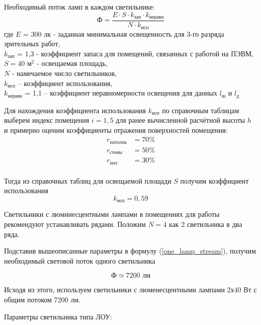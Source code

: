 Необходимый поток ламп в каждом светильнике:
\begin{equation}
\label{one_lamp_stream}
    \text{Ф} = \frac{E \cdot S \cdot k_\text{зап} \cdot k_\text{неравн}}{N \cdot k_\text{исп}}
\end{equation}
где $E$ = 300 лк - заданная минимальная освещенность для 3-го разряда зрительных работ, \\
$k_\text{зап}$ = 1,3 - коэффициент запаса для помещений, связанных с работой на ПЭВМ,   \\
$S = 40 \text{ м}^2$ - освещаемая площадь,                                              \\
$N$ - намечаемое число светильников,                                                    \\
$k_\text{исп}$ – коэффициент использования,                                             \\
$k_\text{неравн}$ = 1,1 – коэффициент неравномерности освещения для данных $l_\text{ш}$ и
$l_\text{д}$

Для нахождения коэффициента использования $k_\text{исп}$ по справочным таблицам
выберем индекс помещения $i = 1,5$ для ранее вычисленной расчётной высоты $h$ и
примерно оценим коэффициенты отражения поверхностей помещения:
\begin{equation}
    \begin{array}{ll}
        r_\text{потолок}    & = 70\% \\
        r_\text{стены}      & = 50\% \\
        r_\text{пол}        & = 30\% \\
    \end{array}
    \label{reflection_coeff}
\end{equation}

Тогда из справочных таблиц для освещаемой площади $S$ получим коэффициент использования
$$
    k_\text{исп} = 0,59
$$

Светильники с люминесцентными лампами в помещениях для работы рекомендуют
устанавливать рядами. Положим $N = 4$ как 2 светильника в два ряда.

Подставив вышеописанные параметры в формулу (\ref{one_lamp_stream}), получим
необходимый световой поток одного светильника

$$
    \text{Ф} \simeq 7200 \text{ лм}
$$

Исходя из этого, используем светильники с люменесцентными лампами 2х40 Вт с
общим потоком 7200 лм.

Параметры светильника типа ЛОУ:

